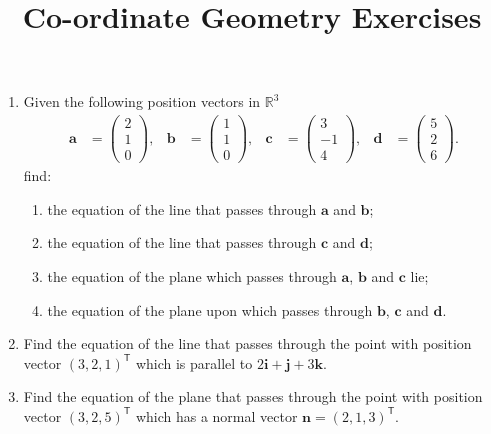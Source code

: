 \documentclass[a4paper,11pt]{article}
\title{Co-ordinate Geometry Exercises}
\begin{document}
\maketitle

\begin{enumerate}[label=4.\arabic*]
    \item Given the following position vectors in $\mathbb{R}^3$
    \begin{align*} 
        \mathbf{a} &= \begin{pmatrix} 2 \\ 1 \\ 0 \end{pmatrix}, &
        \mathbf{b} &= \begin{pmatrix} 1 \\ 1 \\ 0 \end{pmatrix}, &
        \mathbf{c} &= \begin{pmatrix} 3 \\ -1 \\ 4 \end{pmatrix}, &
        \mathbf{d} &= \begin{pmatrix} 5 \\ 2 \\ 6 \end{pmatrix}.
    \end{align*}
    find:
    \begin{enumerate}
        \item the equation of the line that passes through $\mathbf{a}$ and $\mathbf{b}$;
        \item the equation of the line that passes through $\mathbf{c}$ and $\mathbf{d}$;
        \item the equation of the plane which passes through $\mathbf{a}$, $\mathbf{b}$ and $\mathbf{c}$ lie;
        \item the equation of the plane upon which passes through $\mathbf{b}$, $\mathbf{c}$ and $\mathbf{d}$.
    \end{enumerate}

    \item Find the equation of the line that passes through the point with position vector $(3, 2, 1)^\mathsf{T}$ which is parallel to $2 \mathbf{i} + \mathbf{j} + 3 \mathbf{k}$.
    
    \item Find the equation of the plane that passes through the point with position vector $(3, 2, 5)^\mathsf{T}$ which has a normal vector $\mathbf{n} = (2, 1, 3)^\mathsf{T}$.
    

\end{enumerate}
\end{document}
